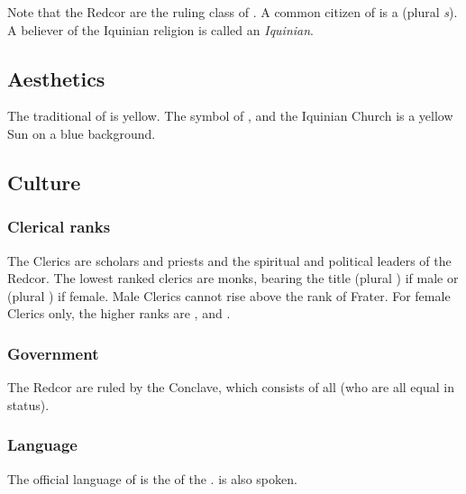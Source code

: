 \index{\Redcean}
Note that the Redcor are the ruling class of \Redce{}. A common citizen of \Redce{} is a \Redcean{} (plural \emph{\Redcean{}s}). A believer of the Iquinian religion is called an \emph{Iquinian}. 









\subsection{Aesthetics}
The traditional \colour of \ClanRedcor is yellow. 
The symbol of \Redce{}, \ClanRedcor and the Iquinian Church is a yellow Sun on a blue background. 









\subsection{Culture}






\subsubsection{Clerical ranks}
The Clerics are scholars and priests and the spiritual and political leaders of the Redcor. 
The lowest ranked clerics are monks, bearing the title \emph{\frater} (plural \emph{\fratres}) if male or \emph{\soror} (plural \emph{\sorores}) if female. 
Male Clerics cannot rise above the rank of Frater. 
For female Clerics only, the higher ranks are \mater, \matron and \matriarch. 





\subsubsection{Government}
The Redcor are ruled by the Conclave, which consists of all \matriarchs{} (who are all equal in status). 





\subsubsection{Language}
The official language of \Redce is the  of the . 
 is also spoken. 





